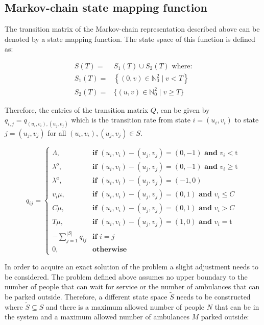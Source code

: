 \documentclass{article}
\begin{document}
\subsection{Markov-chain state mapping function}
The transition matrix of the Markov-chain representation described above can be denoted by a state mapping function. The state space of this function is defined as:



\begin{align}
    S(T) =& S_1(T) \cup S_2(T) \text{ where:} \nonumber \\
    S_1(T) =& \left\{(0, v)\in\mathbb{N}_0^2 \; | \; v < T \right\} \\
    S_2(T) =& \{(u, v)\in\mathbb{N}_0^2 \; | \; v \geq T \} \nonumber
\end{align}

Therefore, the entries of the transition matrix $Q$, can be given by $q_{i,j} = q_{(u_i, v_i),(u_j, v_j)}$ which is the transition rate from state $i = (u_i, v_i)$ to state $j = (u_j , v_j)$ for all $(u_i, v_i), (u_j, v_j) \in S$.

\begin{equation}
    q_{i j} = 
    \begin{cases}
        \Lambda, & \textbf{if } (u_i, v_i) - (u_j, v_j) = (0,-1) \textbf{ and } v_i < \text{t} \\
        \lambda^o, & \textbf{if } (u_i, v_i) - (u_j, v_j) = (0,-1) \textbf{ and } v_i \geq \text{t} \\
        \lambda^a, & \textbf{if } (u_i, v_i) - (u_j, v_j) = (-1,0) \\
        v_i \mu, & \textbf{if } (u_i, v_i) - (u_j, v_j) = (0,1) \textbf{ and } v_i \leq C\\
        C \mu, & \textbf{if } (u_i, v_i) - (u_j, v_j) = (0,1) \textbf{ and } v_i > C \\
        T \mu, & \textbf{if } (u_i, v_i) - (u_j, v_j) = (1,0) \textbf{ and } v_i = \text{t} \\
        -\sum_{j=1}^{|S|}{q_{i j}} & \textbf{if } i = j \\
        0, & \textbf{otherwise}
    \end{cases}
\end{equation}

In order to acquire an exact solution of the problem a slight adjustment needs to be considered. The problem defined above assumes no upper boundary to the number of people that can wait for service or the number of ambulances that can be parked outside. Therefore, a different state space $\tilde S$ needs to be constructed where $\tilde S \subseteq S $ and there is a maximum allowed number of people $N$ that can be in the system and a maximum allowed number of ambulances $M$ parked outside:
\end{document}
